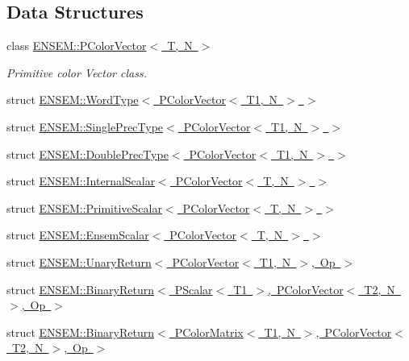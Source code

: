 \subsection*{Data Structures}
\begin{DoxyCompactItemize}
\item 
class \mbox{\hyperlink{classENSEM_1_1PColorVector}{E\+N\+S\+E\+M\+::\+P\+Color\+Vector$<$ T, N $>$}}
\begin{DoxyCompactList}\small\item\em Primitive color Vector class. \end{DoxyCompactList}\item 
struct \mbox{\hyperlink{structENSEM_1_1WordType_3_01PColorVector_3_01T1_00_01N_01_4_01_4}{E\+N\+S\+E\+M\+::\+Word\+Type$<$ P\+Color\+Vector$<$ T1, N $>$ $>$}}
\item 
struct \mbox{\hyperlink{structENSEM_1_1SinglePrecType_3_01PColorVector_3_01T1_00_01N_01_4_01_4}{E\+N\+S\+E\+M\+::\+Single\+Prec\+Type$<$ P\+Color\+Vector$<$ T1, N $>$ $>$}}
\item 
struct \mbox{\hyperlink{structENSEM_1_1DoublePrecType_3_01PColorVector_3_01T1_00_01N_01_4_01_4}{E\+N\+S\+E\+M\+::\+Double\+Prec\+Type$<$ P\+Color\+Vector$<$ T1, N $>$ $>$}}
\item 
struct \mbox{\hyperlink{structENSEM_1_1InternalScalar_3_01PColorVector_3_01T_00_01N_01_4_01_4}{E\+N\+S\+E\+M\+::\+Internal\+Scalar$<$ P\+Color\+Vector$<$ T, N $>$ $>$}}
\item 
struct \mbox{\hyperlink{structENSEM_1_1PrimitiveScalar_3_01PColorVector_3_01T_00_01N_01_4_01_4}{E\+N\+S\+E\+M\+::\+Primitive\+Scalar$<$ P\+Color\+Vector$<$ T, N $>$ $>$}}
\item 
struct \mbox{\hyperlink{structENSEM_1_1EnsemScalar_3_01PColorVector_3_01T_00_01N_01_4_01_4}{E\+N\+S\+E\+M\+::\+Ensem\+Scalar$<$ P\+Color\+Vector$<$ T, N $>$ $>$}}
\item 
struct \mbox{\hyperlink{structENSEM_1_1UnaryReturn_3_01PColorVector_3_01T1_00_01N_01_4_00_01Op_01_4}{E\+N\+S\+E\+M\+::\+Unary\+Return$<$ P\+Color\+Vector$<$ T1, N $>$, Op $>$}}
\item 
struct \mbox{\hyperlink{structENSEM_1_1BinaryReturn_3_01PScalar_3_01T1_01_4_00_01PColorVector_3_01T2_00_01N_01_4_00_01Op_01_4}{E\+N\+S\+E\+M\+::\+Binary\+Return$<$ P\+Scalar$<$ T1 $>$, P\+Color\+Vector$<$ T2, N $>$, Op $>$}}
\item 
struct \mbox{\hyperlink{structENSEM_1_1BinaryReturn_3_01PColorMatrix_3_01T1_00_01N_01_4_00_01PColorVector_3_01T2_00_01N_01_4_00_01Op_01_4}{E\+N\+S\+E\+M\+::\+Binary\+Return$<$ P\+Color\+Matrix$<$ T1, N $>$, P\+Color\+Vector$<$ T2, N $>$, Op $>$}}

\end{DoxyCompactItemize}
